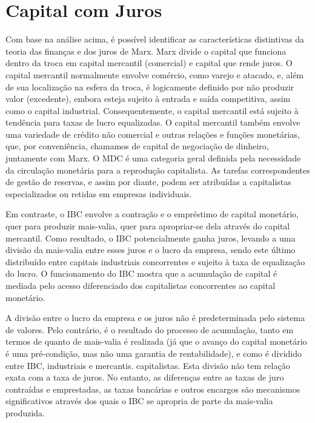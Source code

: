 \section{Capital com Juros}
 \par 
Com base na análise acima, é possível identificar as características distintivas da teoria das finanças e dos juros de Marx. Marx divide o capital que funciona dentro da troca em capital mercantil (comercial) e capital que rende juros. O capital mercantil normalmente envolve comércio, como varejo e atacado, e, além de sua localização na esfera da troca, é logicamente definido por não produzir valor (excedente), embora esteja sujeito à entrada e saída competitiva, assim como o capital industrial. Consequentemente, o capital mercantil está sujeito à tendência para taxas de lucro equalizadas. O capital mercantil também envolve uma variedade de crédito não comercial e outras relações e funções monetárias, que, por conveniência, chamamos de capital de negociação de dinheiro, juntamente com Marx. O MDC é uma categoria geral definida pela necessidade da circulação monetária para a reprodução capitalista. As tarefas correspondentes de gestão de reservas, e assim por diante, podem ser atribuídas a capitalistas especializados ou retidas em empresas individuais.
 \par 
Em contraste, o IBC envolve a contração e o empréstimo de capital monetário, quer para produzir mais-valia, quer para apropriar-se dela através do capital mercantil. Como resultado, o IBC potencialmente ganha juros, levando a uma divisão da mais-valia entre esses juros e o lucro da empresa, sendo este último distribuído entre capitais industriais concorrentes e sujeito à taxa de equalização do lucro. O funcionamento do IBC mostra que a acumulação de capital é mediada pelo acesso diferenciado dos capitalistas concorrentes ao capital monetário.
 \par 
A divisão entre o lucro da empresa e os juros não é predeterminada pelo sistema de valores. Pelo contrário, é o resultado do processo de acumulação, tanto em termos de quanto de mais-valia é realizada (já que o avanço do capital monetário é uma pré-condição, mas não uma garantia de rentabilidade), e como é dividido entre IBC, industriais e mercantis. capitalistas. Esta divisão não tem relação exata com a taxa de juros. No entanto, as diferenças entre as taxas de juro contraídas e emprestadas, as taxas bancárias e outros encargos são mecanismos significativos através dos quais o IBC se apropria de parte da mais-valia produzida.
 \par 
